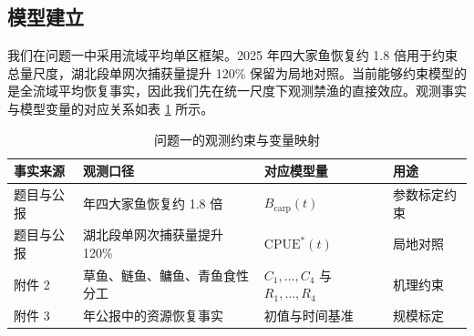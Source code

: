 \documentclass{MMCStyle}
\begin{document}
\subsection{模型建立}
我们在问题一中采用流域平均单区框架。2025 年四大家鱼恢复约 1.8 倍用于约束总量尺度，湖北段单网次捕获量提升 120\% 保留为局地对照。当前能够约束模型的是全流域平均恢复事实，因此我们先在统一尺度下观测禁渔的直接效应。观测事实与模型变量的对应关系如表 \ref{tab:q1_anchor} 所示。
\begin{table}[htbp]
\centering
\caption{问题一的观测约束与变量映射}
\label{tab:q1_anchor}
\begin{tabularx}{0.95\textwidth}{>{\raggedright\arraybackslash}p{2.2cm} >{\raggedright\arraybackslash}p{3.2cm} >{\raggedright\arraybackslash}p{3.2cm} >{\raggedright\arraybackslash}X}
\toprule
事实来源 & 观测口径 & 对应模型量 & 用途 \\
\midrule
题目与公报 & 2025 年四大家鱼恢复约 1.8 倍 & $B_{\text{carp}}(t)$ & 参数标定约束 \\
题目与公报 & 湖北段单网次捕获量提升 120\% & $\mathrm{CPUE}^*(t)$ & 局地对照 \\
附件 2 & 草鱼、鲢鱼、鳙鱼、青鱼食性分工 & $C_1,\dots,C_4$ 与 $R_1,\dots,R_4$ & 机理约束 \\
附件 3 & 2022 年公报中的资源恢复事实 & 初值与时间基准 & 规模标定 \\
\bottomrule
\end{tabularx}
\end{table}
\end{document}
